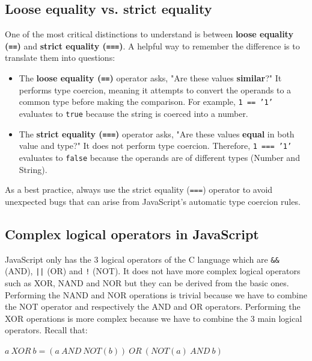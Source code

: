 \documentclass{scrbook}
\begin{document}
\subsection{Loose equality vs. strict equality}

One of the most critical distinctions to understand is between \textbf{loose equality (}\texttt{\textbf{==}}\textbf{)} and \textbf{strict equality (}\texttt{\textbf{===}}\textbf{)}. A helpful way to remember the difference is to translate them into questions:

\begin{itemize}
    \item
    The \textbf{loose equality (}\texttt{\textbf{==}}\textbf{)} operator asks, "Are these values \textbf{similar}?" It performs type coercion, meaning it attempts to convert the operands to a common type before making the comparison. For example, \texttt{1 == '1'} evaluates to \texttt{true} because the string is coerced into a number.
    
    \item
    The \textbf{strict equality (}\texttt{\textbf{===}}\textbf{)} operator asks, "Are these values \textbf{equal} in both value and type?" It does not perform type coercion. Therefore, \texttt{1 === '1'} evaluates to \texttt{false} because the operands are of different types (Number and String).
\end{itemize}

As a best practice, always use the strict equality (\texttt{===}) operator to avoid unexpected bugs that can arise from JavaScript's automatic type coercion rules.

\subsection{Complex logical operators in JavaScript}

JavaScript only has the 3 logical operators of the C language which are \texttt{\&\&} (AND), \texttt{||} (OR) and \texttt{!} (NOT). It does not have more complex logical operators such as XOR, NAND and NOR but they can be derived from the basic ones.\\

Performing the NAND and NOR operations is trivial because we have to combine the NOT operator and respectively the AND and OR operators. Performing the XOR operations is more complex because we have to combine the 3 main logical operators. Recall that:

\begin{center}
    $a~XOR~b = (a~AND~NOT(b))~OR~(NOT(a)~AND~b)$
\end{center}
\end{document}
